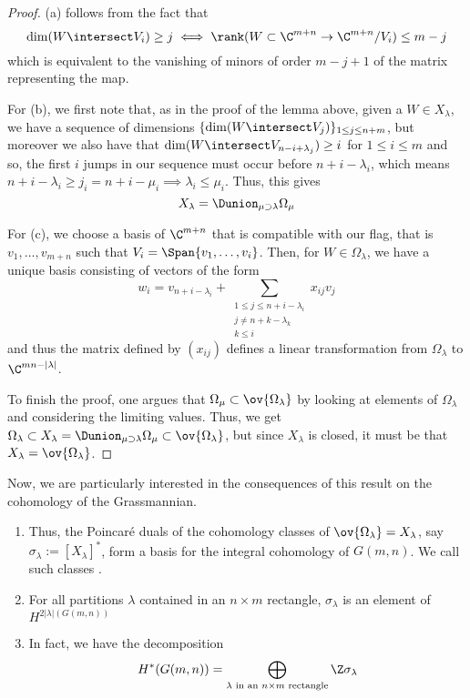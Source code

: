 \documentclass[11pt,leqno,oneside]{amsart}
\numberwithin{thm}{section}
\begin{document}
\begin{proof}
  (a) follows from the fact that \[
    \dim(W \intersect V_i) \geq j \iff \rank(W \subset \C^{m+n} \to
    \C^{m+n}/V_i) \leq m-j
  \]
  which is equivalent to the vanishing of minors of order \(m-j+1\) of
  the matrix representing the map.

  For (b), we first note that, as in the proof of the lemma above,
  given a \(W \in 
  X_\lambda\), we have a sequence of dimensions \(\{\dim(W \intersect
  V_j)\}_{1 \leq j \leq n+m}\), but moreover we also
  have that \(\dim(W \intersect V_{n-i+\lambda_j}) \geq i\) for \(1
  \leq i \leq m\) and so, the first \(i\) jumps in our sequence must
  occur before \(n+i-\lambda_i\), which means \(n+i-\lambda_i \geq j_i
  = n+i-\mu_i \implies \lambda_i \leq \mu_i\). Thus, this gives \[
    X_\lambda = \Dunion_{\mu \supset \lambda} \Omega_\mu
  \]

  For (c), we choose a basis of \(\C^{m+n}\) that is compatible with
  our flag, that is \(v_1, \ldots, v_{m+n}\) such that \(V_i =
  \Span\{v_1, \ldots, v_i\}\). Then, for \(W \in \Omega_\lambda\), we
  have a unique basis consisting of vectors of the form \[
    w_i = v_{n+i-\lambda_i} + \sum_{\substack{1 \leq j \leq
        n+i-\lambda_i \\ j \neq n+k-\lambda_k \\ k \leq i}} x_{ij} v_j
  \]
  and thus the matrix defined by \((x_{ij})\) defines a linear
  transformation from \(\Omega_\lambda\) to \(\C^{mn-|\lambda|}\).

  To finish the proof, one argues that \(\Omega_\mu \subset
  \ov{\Omega_\lambda}\) by looking at elements of \(\Omega_\lambda\)
  and considering the limiting values. Thus, we get \(\Omega_\lambda
  \subset X_\lambda = \Dunion_{\mu \supset \lambda} \Omega_\mu \subset
  \ov{\Omega_\lambda}\), but since \(X_\lambda\) is closed, it must be
  that \(X_\lambda = \ov{\Omega_\lambda}\).
\end{proof}
Now, we are particularly interested in the consequences of this result
on the cohomology of the Grassmannian.
\begin{cor}
  \begin{enumerate}
  \item   Thus, the Poincar\'{e} duals of the cohomology classes of
    \(\ov{\Omega_\lambda} = X_\lambda\), say \(\sigma_\lambda :=
    [X_\lambda]^*\), form a basis for the 
    integral cohomology of \(G(m,n)\). We call such classes
    .
  \item For
    all partitions \(\lambda\) contained in an \(n \times m\)
    rectangle, \(\sigma_\lambda\) is an element of
    \(H^{2|\lambda|(G(m,n))}\)
  \item In fact, we have the decomposition \[
      H^*(G(m,n)) = \bigoplus_{\lambda \text{ in an }n \times m\text{
          rectangle}} \Z \sigma_\lambda
    \]
  \end{enumerate}
\end{cor}
\end{document}
